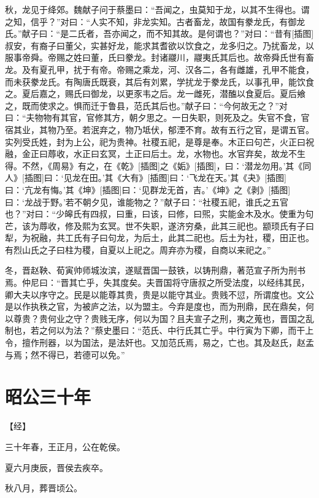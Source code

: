 \documentclass[a4paper,12pt,UTF8,twoside]{ctexbook}
\begin{document}
秋，龙见于绛郊。魏献子问于蔡墨曰：“吾闻之，虫莫知于龙，以其不生得也。谓之知，信乎？”对曰：“人实不知，非龙实知。古者畜龙，故国有豢龙氏，有御龙氏。”献子曰：“是二氏者，吾亦闻之，而不知其故。是何谓也？”对曰：“昔有[插图]叔安，有裔子曰董父，实甚好龙，能求其耆欲以饮食之，龙多归之。乃扰畜龙，以服事帝舜。帝赐之姓曰董，氏曰豢龙。封诸鬷川，鬷夷氏其后也。故帝舜氏世有畜龙。及有夏孔甲，扰于有帝。帝赐之乘龙，河、汉各二，各有雌雄，孔甲不能食，而未获豢龙氏。有陶唐氏既衰，其后有刘累，学扰龙于豢龙氏，以事孔甲，能饮食之。夏后嘉之，赐氏曰御龙，以更豕韦之后。龙一雌死，潜醢以食夏后。夏后飨之，既而使求之。惧而迁于鲁县，范氏其后也。”献子曰：“今何故无之？”对曰：“夫物物有其官，官修其方，朝夕思之。一日失职，则死及之。失官不食，官宿其业，其物乃至。若泯弃之，物乃坻伏，郁湮不育。故有五行之官，是谓五官。实列受氏姓，封为上公，祀为贵神。社稷五祀，是尊是奉。木正曰句芒，火正曰祝融，金正曰蓐收，水正曰玄冥，土正曰后土。龙，水物也。水官弃矣，故龙不生得。不然，《周易》有之，在《乾》[插图]之《姤》[插图]，曰：‘潜龙勿用。’其《同人》[插图]曰：‘见龙在田。’其《大有》[插图]曰：‘飞龙在天。’其《夬》[插图]曰：‘亢龙有悔。’其《坤》[插图]曰：‘见群龙无首，吉。’《坤》之《剥》[插图]曰：‘龙战于野。’若不朝夕见，谁能物之？”献子曰：“社稷五祀，谁氏之五官也？”对曰：“少皞氏有四叔，曰重，曰该，曰修，曰煕，实能金木及水。使重为句芒，该为蓐收，修及熙为玄冥。世不失职，遂济穷桑，此其三祀也。颛顼氏有子曰犁，为祝融，共工氏有子曰句龙，为后土，此其二祀也。后土为社，稷，田正也。有烈山氏之子曰柱为稷，自夏以上祀之。周弃亦为稷，自商以来祀之。”

冬，晋赵鞅、荀寅帅师城汝滨，遂赋晋国一鼓铁，以铸刑鼎，著范宣子所为刑书焉。仲尼曰：“晋其亡乎，失其度矣。夫晋国将守唐叔之所受法度，以经纬其民，卿大夫以序守之。民是以能尊其贵，贵是以能守其业。贵贱不愆，所谓度也。文公是以作执秩之官，为被庐之法，以为盟主。今弃是度也，而为刑鼎，民在鼎矣，何以尊贵？贵何业之守？贵贱无序，何以为国？且夫宣子之刑，夷之蒐也，晋国之乱制也，若之何以为法？”蔡史墨曰：“范氏、中行氏其亡乎。中行寅为下卿，而干上令，擅作刑器，以为国法，是法奸也。又加范氏焉，易之，亡也。其及赵氏，赵孟与焉；然不得已，若德可以免。”


\chapter{昭公三十年}



【经】

三十年春，王正月，公在乾侯。

夏六月庚辰，晋侯去疾卒。

秋八月，葬晋顷公。
\end{document}
